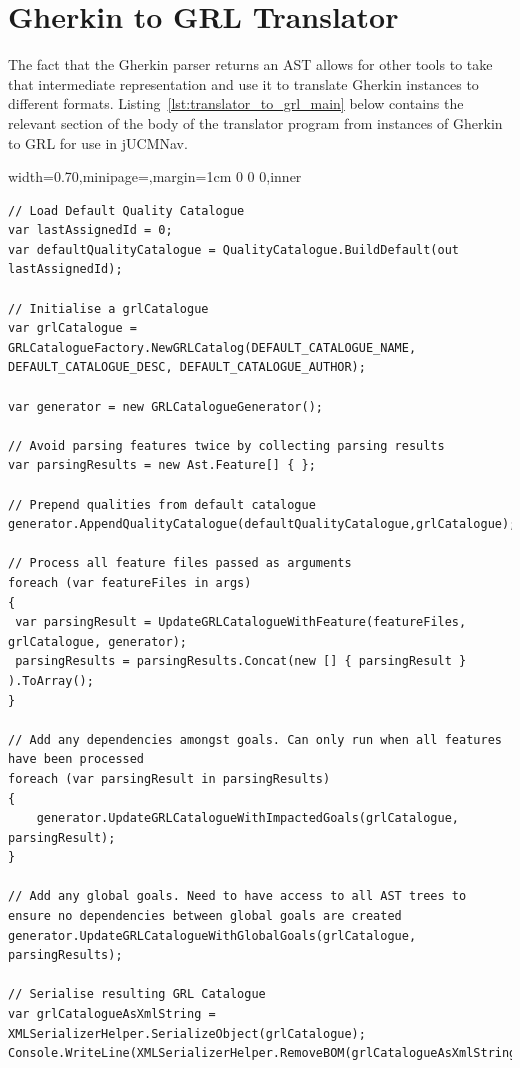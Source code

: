\documentclass[dissertation,final]{softeng}
\newenvironment{featurecode}[1]
{ \lrbox\featurebox \begin{adjustbox}{width=#1\textwidth,minipage=\textwidth,margin=1cm 0 0 0,inner} }
{ \end{adjustbox}\endlrbox}
\newenvironment{featurelist}[2]
{
\newcommand{\setcaption}{\caption{#1}}
\newcommand{\setlabel}{\label{#2}}
}
{\begin{listing}[h!]\centering\usebox\featurebox\setcaption\setlabel\end{listing}}
\begin{document}
\clearpage
\section{Gherkin to GRL Translator}
\label{sec:grl_translator}
The fact that the Gherkin parser returns an AST allows for other tools to take that intermediate representation and use it to translate Gherkin instances to different formats. Listing~\ref{lst:translator_to_grl_main} below contains the relevant section of the body of the translator program from instances of Gherkin to GRL for use in jUCMNav.

\begin{featurelist}{Translator to GRL -- main body}{lst:translator_to_grl_main}
\begin{featurecode}{0.70}
\begin{verbatim}
// Load Default Quality Catalogue
var lastAssignedId = 0;
var defaultQualityCatalogue = QualityCatalogue.BuildDefault(out lastAssignedId);

// Initialise a grlCatalogue
var grlCatalogue = GRLCatalogueFactory.NewGRLCatalog(DEFAULT_CATALOGUE_NAME, DEFAULT_CATALOGUE_DESC, DEFAULT_CATALOGUE_AUTHOR);

var generator = new GRLCatalogueGenerator();

// Avoid parsing features twice by collecting parsing results
var parsingResults = new Ast.Feature[] { };

// Prepend qualities from default catalogue
generator.AppendQualityCatalogue(defaultQualityCatalogue,grlCatalogue);

// Process all feature files passed as arguments
foreach (var featureFiles in args)
{
 var parsingResult = UpdateGRLCatalogueWithFeature(featureFiles, grlCatalogue, generator);
 parsingResults = parsingResults.Concat(new [] { parsingResult } ).ToArray();
}

// Add any dependencies amongst goals. Can only run when all features have been processed
foreach (var parsingResult in parsingResults)
{
    generator.UpdateGRLCatalogueWithImpactedGoals(grlCatalogue, parsingResult);
}

// Add any global goals. Need to have access to all AST trees to ensure no dependencies between global goals are created
generator.UpdateGRLCatalogueWithGlobalGoals(grlCatalogue, parsingResults);

// Serialise resulting GRL Catalogue
var grlCatalogueAsXmlString = XMLSerializerHelper.SerializeObject(grlCatalogue);
Console.WriteLine(XMLSerializerHelper.RemoveBOM(grlCatalogueAsXmlString));
\end{verbatim}
\end{featurecode}
\end{featurelist}
\end{document}
